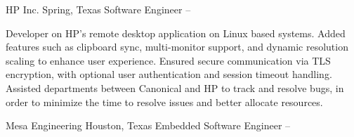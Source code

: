 \documentclass[letterpaper,MMMyyyy,nonstopmode]{simpleresumecv}
\begin{document}
\begin{Body}
    \vspace{3mm} %

    \SubSection
    {HP Inc.}
    {Spring, Texas}
    {Software Engineer}
    { -- }

    \begin{Detail}
        \BulletItem
        Developer on HP's remote desktop application on Linux based systems. Added features such as clipboard sync, multi-monitor support, and dynamic resolution scaling to enhance user experience.
        \vspace{1mm} %
        \BulletItem
        Ensured secure communication via TLS encryption, with optional user authentication and session timeout handling.
        \vspace{1mm} %
        \BulletItem
        Assisted departments between Canonical and HP to track and resolve bugs, in order to minimize the time to resolve issues and better allocate resources.
        \vspace{1mm} %
    \end{Detail}
    \vspace{3mm} %

    \SubSection
    {Mesa Engineering}
    {Houston, Texas}
    {Embedded Software Engineer}
    { -- }


\end{Body}
\end{document}
